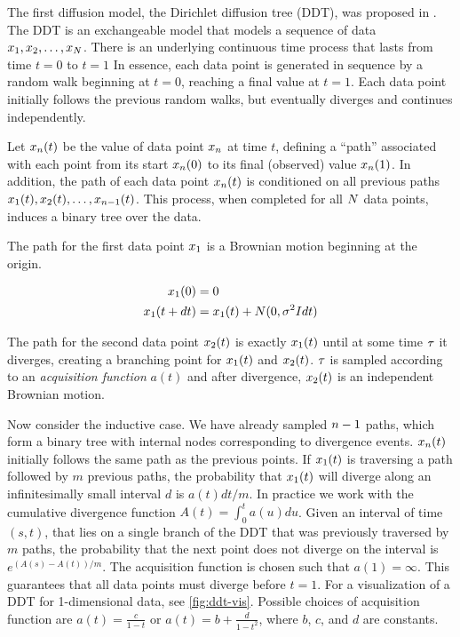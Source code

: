 The first diffusion model, the Dirichlet diffusion tree (DDT),
was proposed in \citet{Neal2003}.
The DDT is an exchangeable model that models a sequence of data
$x_1, x_2,\ldots,x_N$.
There is an underlying continuous time process
that lasts from time $t = 0$ to $t = 1$
In essence, each data point is generated in sequence by
a random walk beginning at $t = 0$,
reaching a final value at $t = 1$.
Each data point initially follows the previous
random walks, but eventually diverges and continues independently.

Let $x_n(t)$ be the value of data point $x_n$
at time $t$, defining a ``path'' associated
with each point from its start $x_n(0)$ to its final (observed) value $x_n(1)$.
In addition, the path of each data point $x_n(t)$ is conditioned
on all previous paths $x_1(t), x_2(t), \ldots, x_{n - 1}(t)$.
This process, when completed for all $N$ data points,
induces a binary tree over the data.

The path for the first data point $x_1$
is a Brownian motion
beginning at the origin.

\begin{align}
  x_1(0) &= 0 \\
  x_1(t + dt) &= x_1(t) + N(0, \sigma^2Idt)
\end{align}

The path for the second data point $x_2(t)$
is exactly $x_1(t)$ until
at some time $\tau$ it diverges,
creating a branching point for
$x_1(t)$ and $x_2(t)$.
$\tau$ is sampled according to an \emph{acquisition function}
$a(t)$ and
after divergence, $x_2(t)$ is an
independent Brownian motion.

Now consider the inductive case.
We have already sampled $n - 1$
paths, which form a binary tree
with internal nodes corresponding to
divergence events.
$x_n(t)$ initially follows the same
path as the previous points.
If $x_1(t)$ is traversing a path
followed by $m$ previous paths,
the probability that $x_1(t)$ will
diverge along an infinitesimally small
interval $d$ is 
$a(t)dt/m$. 
In practice we work with the cumulative
divergence function $A(t) = \int_0^t a(u)du$.
Given an interval of time $(s, t)$,
that lies on a single branch of the DDT
that was previously traversed by $m$ paths,
the probability that the next point
does not diverge on the interval
is $e^{(A(s) - A(t))/m}$.
The acquisition function is chosen such that
$a(1) = \infty$. This guarantees that
all data points must diverge 
before $t = 1$. 
For a visualization of a DDT
for 1-dimensional data, see \autoref{fig:ddt-vis}.
Possible choices of acquisition function
are $a(t) = \frac{c}{1 - t}$ or $a(t) = b + \frac{d}{1 - t^2}$,
where $b$, $c$, and $d$ are constants.

